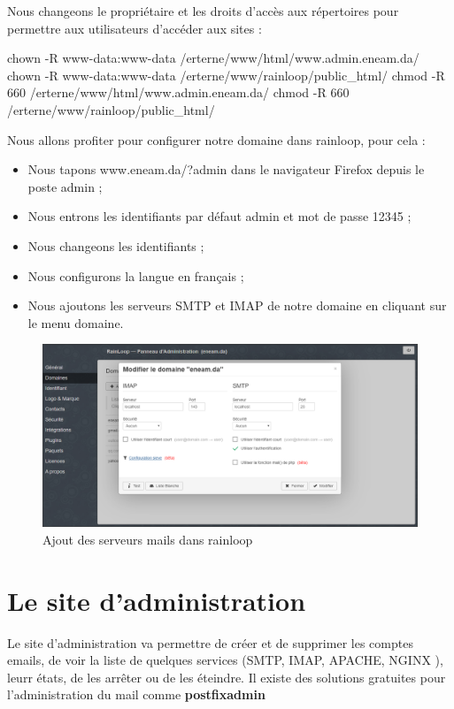 \documentclass[a4paper,12pt,french]{report} %
\begin{document}
Nous changeons le propriétaire et les droits d'accès aux répertoires pour permettre aux utilisateurs d'accéder aux sites :
\begin{exempleConsole}
chown -R www-data:www-data /erterne/www/html/www.admin.eneam.da/ 
chown -R www-data:www-data /erterne/www/rainloop/public_html/
chmod -R 660  /erterne/www/html/www.admin.eneam.da/  
chmod -R 660 /erterne/www/rainloop/public_html/
\end{exempleConsole}
Nous allons profiter pour configurer notre domaine dans rainloop, pour cela :
\begin{itemize}
	\item Nous tapons www.eneam.da/?admin dans le navigateur Firefox depuis le poste admin ;
	\item Nous entrons les identifiants par défaut admin et mot de passe 12345 ;
	\item Nous changeons les identifiants ;
	\item Nous configurons la langue en français ;
	\item Nous ajoutons les serveurs SMTP et IMAP de notre domaine en cliquant sur le menu domaine.
\end{itemize} 
\begin{figure}[H]
	\centering
	\includegraphics[width=483pt]{figure/configuration-domaine-rainloop.png}
	\caption{Ajout des serveurs mails dans rainloop}
\end{figure}

\section{Le site d'administration}
Le site d'administration va permettre de créer et de supprimer  les comptes emails, de voir la liste de quelques services (SMTP, IMAP, APACHE, NGINX ), leurr états,  de les arrêter ou de les éteindre. %
Il existe des solutions gratuites pour l'administration du mail comme \textbf{postfixadmin}
\end{document}
